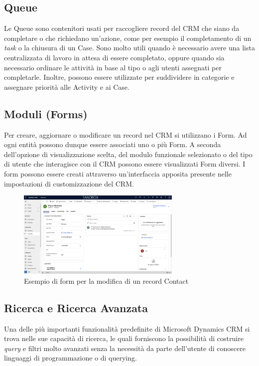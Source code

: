 \subsection{Queue}
Le Queue sono contenitori usati per raccogliere record del CRM che siano da completare o che richiedano un'azione, come per esempio il completamento di un \textit{task} o la chiusura di un Case.
Sono molto utili quando è necessario avere una lista centralizzata di lavoro in attesa di essere completato, oppure quando sia necessario ordinare le attività in base al tipo o agli utenti assegnati per completarle.
Inoltre, possono essere utilizzate per suddividere in categorie e assegnare priorità alle Activity e ai Case.~\cite{Queues}

\subsection{Moduli (Forms)}
Per creare, aggiornare o modificare un record nel CRM si utilizzano i Form. Ad ogni entità possono dunque essere associati uno o più Form. A seconda dell'opzione di visualizzazione scelta, del modulo funzionale selezionato o del tipo di utente che interagisce con il CRM possono essere visualizzati Form diversi. 
I form possono essere creati attraverso un'interfaccia apposita presente nelle impostazioni di customizzazione del CRM.
\begin{figure}[ht!]
  \centering
  \includegraphics[width=0.7\textwidth]{form-example.png}
  \caption{Esempio di form per la modifica di un record Contact}
  \label{fig:formExample}
\end{figure}

\subsection{Ricerca e Ricerca Avanzata}
Una delle più importanti funzionalità predefinite di Microsoft Dynamics CRM si trova nelle sue capacità di ricerca, le quali forniscono la possibilità di costruire \textit{query} e filtri molto avanzati senza la necessità da parte dell'utente di conoscere linguaggi di programmazione o di querying.

